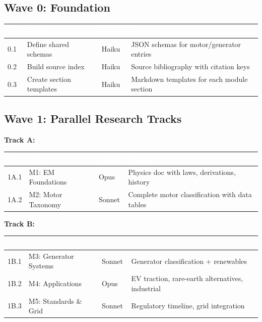 \documentclass[11pt,letterpaper]{article}
\newcommand{\tableheader}[1]{\textbf{\sffamily\textcolor{white}{#1}}}
\begin{document}
\subsection{Wave 0: Foundation}

\begin{center}
\begin{tabularx}{\textwidth}{C{0.6cm}L{3cm}C{1.5cm}X}
\toprule
{}
\tableheader{Seq} & \tableheader{Task} & \tableheader{Model} & \tableheader{Output} \\
 & Define shared schemas & Haiku & JSON schemas for motor/generator entries \\
0.2 & Build source index & Haiku & Source bibliography with citation keys \\
0.3 & Create section templates & Haiku & Markdown templates for each module section \\
\bottomrule
\end{tabularx}
\end{center}

\subsection{Wave 1: Parallel Research Tracks}

\textbf{Track A:}

\begin{center}
\begin{tabularx}{\textwidth}{C{0.6cm}L{3.5cm}C{1.5cm}X}
\toprule
{}
\tableheader{Seq} & \tableheader{Task} & \tableheader{Model} & \tableheader{Output} \\
\midrule
1A.1 & M1: EM Foundations & Opus & Physics doc with laws, derivations, history \\
1A.2 & M2: Motor Taxonomy & Sonnet & Complete motor classification with data tables \\
\bottomrule
\end{tabularx}
\end{center}

\textbf{Track B:}

\begin{center}
\begin{tabularx}{\textwidth}{C{0.6cm}L{3.5cm}C{1.5cm}X}
\toprule
{}
\tableheader{Seq} & \tableheader{Task} & \tableheader{Model} & \tableheader{Output} \\
\midrule
1B.1 & M3: Generator Systems & Sonnet & Generator classification + renewables \\
1B.2 & M4: Applications & Opus & EV traction, rare-earth alternatives, industrial \\
1B.3 & M5: Standards \& Grid & Sonnet & Regulatory timeline, grid integration \\
\bottomrule
\end{tabularx}
\end{center}
\end{document}
